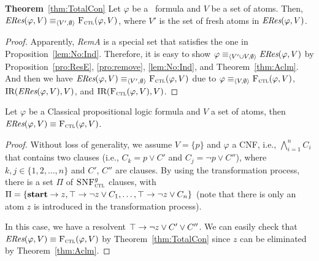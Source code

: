 \documentclass[twoside,11pt]{article}
\begin{document}
	\noindent\textbf{Theorem}~\ref{thm:TotalCon}
	Let $\varphi$ be a \CTL\ formula and $V$ be a set of atoms.
	Then, $\emph{ERes}(\varphi,V)\equiv_{{\langle{V',\emptyset}\rangle}} {\textsc{F}_{\textsc{ctl}}}(\varphi,V)$,
	where $V'$ is the set of fresh atoms in $\emph{ERes}(\varphi,V)$.
	\\
	\begin{proof}
		Apparently, \emph{RemA} is a special set that satisfies the one in Proposition~\ref{lem:No:Ind}. Therefore, it is easy to show $\varphi \equiv_{{\langle{V'\cup V, \emptyset}\rangle}} \emph{ERes}(\varphi,V)$ by Proposition~\ref{pro:ResE}, \ref{pro:remove}, \ref{lem:No:Ind}, and Theorem~\ref{thm:Aclm}. And then we have $\emph{ERes}(\varphi,V)\equiv_{{\langle{V',\emptyset}\rangle}} {\textsc{F}_{\textsc{ctl}}}(\varphi,V)$ due to $\varphi \equiv_{{\langle{V,\emptyset}\rangle}} {\textsc{F}_{\textsc{ctl}}}(\varphi,V)$, $\textrm{IR}(\emph{ERes}(\varphi,V), V)$, and $\textrm{IR}({\textsc{F}_{\textsc{ctl}}}(\varphi,V), V)$.
	\end{proof}
	
	\begin{lemma}\label{lem:cplExiF}
		Let $\varphi$ be a Classical propositional logic formula and $V$ a set of atoms, then $\emph{ERes}(\varphi, V) \equiv {\textsc{F}_{\textsc{ctl}}}(\varphi, V)$.
	\end{lemma}
	
	\begin{proof}
		Without loss of generality, we assume $V=\{p\}$ and $\varphi$ a CNF, i.e., $\bigwedge_{i=1}^n C_i$ that contains two clauses (i.e., $C_k = p \vee C'$  and $C_j = \neg p \vee C''$),  where $k, j \in \{1, 2, \dots, n\}$ and $C'$, $C''$ are clauses. By using the transformation process, there is a set $\Pi$ of ${\textsc{SNF}_{\textsc{ctl}}^g}$ clauses, with $\Pi=\{\textbf{start}\rightarrow z, \top \rightarrow \neg z \vee C_1, \dots, \top \rightarrow \neg z \vee C_n\}$ (note that there is only an atom $z$ is introduced in the transformation process).
		
		In this case, we have a resolvent $\top \rightarrow \neg z \vee C' \vee C''$. We can easily check that $\emph{ERes}(\varphi, V) \equiv {\textsc{F}_{\textsc{ctl}}}(\varphi, V)$ by Theorem~\ref{thm:TotalCon} since $z$ can be eliminated by Theorem~\ref{thm:Aclm}.
	\end{proof}
	
\end{document}
